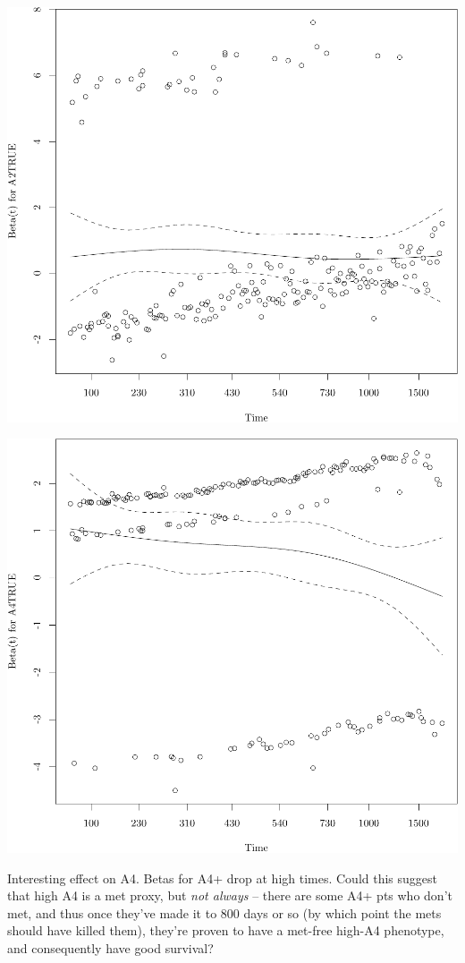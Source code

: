 \documentclass{article}\usepackage[]{graphicx}\usepackage[]{color}
\makeatletter
\def\maxwidth{ %
  \ifdim\Gin@nat@width>\linewidth
    \linewidth
  \else
    \Gin@nat@width
  \fi
}
\newenvironment{knitrout}{}{} %
\makeatother
\begin{document}
\begin{knitrout}
{\centering \includegraphics[width=\maxwidth]{figure/05-eda-ph-check-reduced-2} 

}




{\centering \includegraphics[width=\maxwidth]{figure/05-eda-ph-check-reduced-3} 

}



\end{knitrout}
Interesting effect on A4.  Betas for A4+ drop at high times.  Could this suggest that high A4 is a met proxy, but \emph{not always} -- there are some A4+ pts who don't met, and thus once they've made it to 800 days or so (by which point the mets should have killed them), they're proven to have a met-free high-A4 phenotype, and consequently have good survival?
\end{document}

